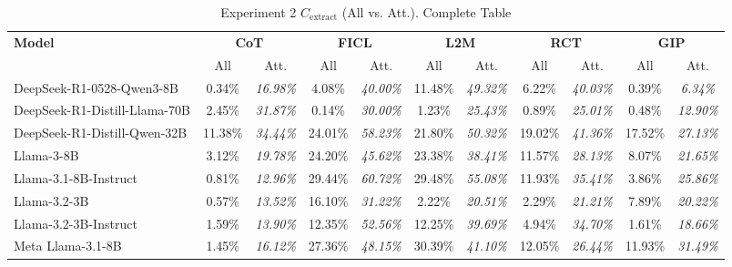 \documentclass[conference]{IEEEtran}
\begin{document}
\begin{table}[t]
  \centering
  \setlength{\tabcolsep}{4pt}
  \caption{Experiment 2 $C_{\mathrm{extract}}$ (All vs. Att.). Complete Table}
  \label{app:tab_exp2_cextract}
  \begin{tabular}{l *{5}{cc}}
    \toprule
    \textbf{Model}      & \multicolumn{2}{c}{\textbf{CoT}}      & \multicolumn{2}{c}{\textbf{FICL}}     & \multicolumn{2}{c}{\textbf{L2M}}      & \multicolumn{2}{c}{\textbf{RCT}}      & \multicolumn{2}{c}{\textbf{GIP}}     \\
    \cmidrule{2-3} \cmidrule{4-5} \cmidrule{6-7} \cmidrule{8-9} \cmidrule{10-11}
                        & All      & Att.     & All      & Att.     & All      & Att.     & All      & Att.     & All      & Att.    \\
    \midrule
DeepSeek-R1-0528-Qwen3-8B       & 0.34\%   & \textit{16.98\%}    & 4.08\%   & \textit{40.00\%}    & 11.48\%  & \textit{49.32\%}    & 6.22\%   & \textit{40.03\%}    & 0.39\%   & \textit{6.34\%}    \\
DeepSeek-R1-Distill-Llama-70B   & 2.45\%   & \textit{31.87\%}    & 0.14\%   & \textit{30.00\%}    & 1.23\%   & \textit{25.43\%}    & 0.89\%   & \textit{25.01\%}    & 0.48\%   & \textit{12.90\%}   \\
DeepSeek-R1-Distill-Qwen-32B    & 11.38\%  & \textit{34.44\%}    & 24.01\%  & \textit{58.23\%}    & 21.80\%  & \textit{50.32\%}    & 19.02\%  & \textit{41.36\%}    & 17.52\%  & \textit{27.13\%}   \\
Llama-3-8B                      & 3.12\%   & \textit{19.78\%}    & 24.20\%  & \textit{45.62\%}    & 23.38\%  & \textit{38.41\%}    & 11.57\%  & \textit{28.13\%}    & 8.07\%   & \textit{21.65\%}   \\
Llama-3.1-8B-Instruct           & 0.81\%   & \textit{12.96\%}    & 29.44\%  & \textit{60.72\%}    & 29.48\%  & \textit{55.08\%}    & 11.93\%  & \textit{35.41\%}    & 3.86\%   & \textit{25.86\%}   \\
Llama-3.2-3B                    & 0.57\%   & \textit{13.52\%}    & 16.10\%  & \textit{31.22\%}    & 2.22\%   & \textit{20.51\%}    & 2.29\%   & \textit{21.21\%}    & 7.89\%   & \textit{20.22\%}   \\
Llama-3.2-3B-Instruct           & 1.59\%   & \textit{13.90\%}    & 12.35\%  & \textit{52.56\%}    & 12.25\%  & \textit{39.69\%}    & 4.94\%   & \textit{34.70\%}    & 1.61\%   & \textit{18.66\%}   \\
Meta Llama-3.1-8B               & 1.45\%   & \textit{16.12\%}    & 27.36\%  & \textit{48.15\%}    & 30.39\%  & \textit{41.10\%}    & 12.05\%  & \textit{26.44\%}    & 11.93\%  & \textit{31.49\%}   \\

\end{tabular}
\end{table}
\end{document}
